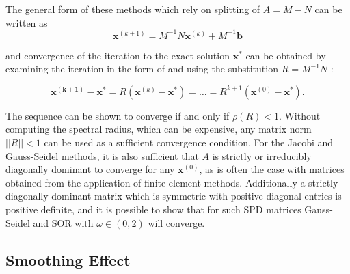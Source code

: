 
The general form of these methods which rely on splitting of $A = M - N$ can be written as
\begin{equation}
	\mathbf{x}^{(k+1)} = M^{-1}N\mathbf{x}^{(k)} + M^{-1}\mathbf{b}
\end{equation}

and convergence of the iteration to the exact solution $\mathbf{x}^*$ can be obtained by examining the iteration in the form of and using the substitution $R = M^{-1}N $ :

\begin{equation}
	\mathbf{x^{(k+1)}} - \mathbf{x}^* = R\left(\mathbf{x}^{(k)} - \mathbf{x}^* \right) = \ldots = R^{k+1}\left(\mathbf{x}^{(0)} - \mathbf{x}^* \right).
\end{equation}


The sequence can be shown to converge if and only if $\rho\left( R \right) < 1$. Without computing the spectral radius, which can be expensive, any matrix norm $|| R || < 1$ can be used as a sufficient convergence condition. For the Jacobi and Gauss-Seidel methods, it is also sufficient that $A$ is strictly or irreducibly diagonally dominant to converge for any $\mathbf{x}^{(0)}$, as is often the case with matrices obtained from the application of finite element methods. Additionally a strictly diagonally dominant matrix which is symmetric with positive diagonal entries is positive definite, and it is possible to show that for such SPD matrices Gauss-Seidel and SOR with $\omega \in (0, 2)$ will converge. %


%

\subsection{Smoothing Effect}

